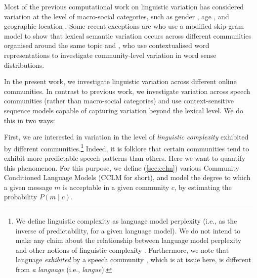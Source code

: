 \documentclass[11pt]{article}
\begin{document}
Most of the previous computational work on linguistic variation 
has considered variation at the level of macro-social categories, such as gender
\citep{Burger2011,Ciot2013,Bamman2014}, age \citep{Nguyen2013}, and
geographic location \citep{Eisenstein2010,Bamman2014a}.
Some recent exceptions are \citet{DelTredici2017} who use a modified
skip-gram model to show that lexical semantic variation occurs across 
different communities organised around the same topic and 
\citet{Lucy2021}, who use contextualised word representations to
investigate community-level variation in word sense distributions.

In the present work, we investigate linguistic variation
across different online communities. In contrast to previous work, we
investigate variation across speech communities (rather than
macro-social categories) and use context-sensitive sequence models
capable of capturing variation beyond the lexical level.
We do this in two ways:

First, we are interested in
variation in the level of \emph{linguistic complexity}
exhibited by different communities.\footnote{
  We define linguistic complexity as language model perplexity
  (i.e., as the inverse of predictability, for a given language model).
  We do not intend to make any claim about the relationship
  between language model perplexity and other notions of linguistic
  complexity \citep[cf.][]{Hawkins2014}. Furthermore, we note that 
  language \emph{exhibited} by a speech community \citep[i.e., \emph{parole},][]{deSaussure2011},
  which is at issue here,
  is  different from \emph{a language} (i.e., \emph{langue}).}
%  
%
%
Indeed, it is folklore that certain communities tend to exhibit more predictable
speech patterns than others.  Here we want to quantify this
phenomenon.  For this purpose, we define (\cref{sec:cclm}) 
various Community Conditioned Language Models 
(CCLM for short), and model the degree to which a
given message $m$ is acceptable in a given community $c$, by estimating the probability
\(P(m \mid c)\).
\end{document}

